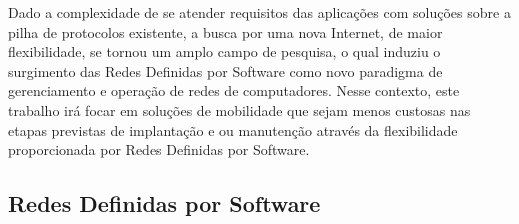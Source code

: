 \documentclass[	12pt, Times, openright, twoside, a4paper, english, brazil]{abntex2}
\begin{document}
Dado a complexidade de se atender requisitos das aplicações com soluções sobre a pilha de protocolos existente, a busca por uma nova Internet, de maior flexibilidade, se tornou um amplo campo de pesquisa, o qual induziu o surgimento das Redes Definidas por Software como  novo paradigma de gerenciamento e operação de redes de computadores. Nesse contexto, este trabalho irá focar em soluções de mobilidade que sejam menos custosas nas etapas previstas de implantação e ou manutenção através da flexibilidade proporcionada por Redes Definidas por Software.

\subsection{Redes Definidas por Software}

\end{document}
